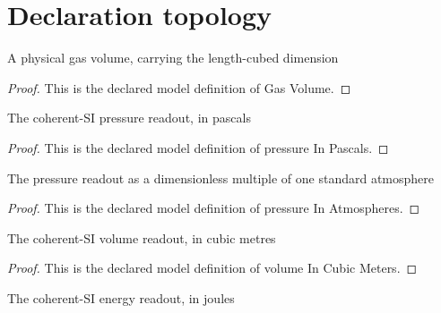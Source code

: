 \section{Declaration topology}
\begin{definition}
  \label{def:physics:phyx-mini-0347:phyxminiproblems-problemphyxmini0347-gasvolume}
  A physical gas volume, carrying the length-cubed dimension
\end{definition}
\begin{proof}
  This is the declared model definition of Gas Volume.
\end{proof}
\begin{definition}
  \label{def:physics:phyx-mini-0347:phyxminiproblems-problemphyxmini0347-pressureinpascals}
  The coherent-SI pressure readout, in pascals
\end{definition}
\begin{proof}
  This is the declared model definition of pressure In Pascals.
\end{proof}
\begin{definition}
  \label{def:physics:phyx-mini-0347:phyxminiproblems-problemphyxmini0347-pressureinatmospheres}
  The pressure readout as a dimensionless multiple of one standard atmosphere
\end{definition}
\begin{proof}
  This is the declared model definition of pressure In Atmospheres.
\end{proof}
\begin{definition}
  \label{def:physics:phyx-mini-0347:phyxminiproblems-problemphyxmini0347-volumeincubicmeters}
  The coherent-SI volume readout, in cubic metres
\end{definition}
\begin{proof}
  This is the declared model definition of volume In Cubic Meters.
\end{proof}
\begin{definition}
  \label{def:physics:phyx-mini-0347:phyxminiproblems-problemphyxmini0347-energyinjoules}
  The coherent-SI energy readout, in joules
\end{definition}
